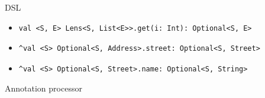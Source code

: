 \documentclass[xcolor={dvipsnames}]{beamer}
\begin{document}
\begin{frame}[fragile, t]{DSL}
\begin{itemize}
        \item<blue@1->
            \begin{lstlisting}
val <S, E> Lens<S, List<E>>.get(i: Int): Optional<S, E>
            \end{lstlisting}            


        \item<gray@1->
            \begin{lstlisting}
^val <S> Optional<S, Address>.street: Optional<S, Street>
            \end{lstlisting}            


        \item<purple@1->
            \begin{lstlisting}
^val <S> Optional<S, Street>.name: Optional<S, String>
            \end{lstlisting}

    \end{itemize}

\end{frame}

\begin{frame}{Annotation processor}
    
\end{frame}
\end{document}
